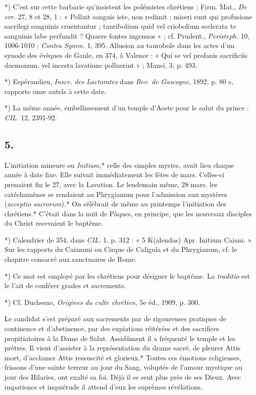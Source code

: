 \documentclass[a4paper, 11pt, oneside, polutonikogreek, french]{article}
\begin{document}
*) C'est sur cette barbarie qu'insistent les polémistes chrétiens ; Firm. Mat., \emph{De err.} 27, 8 et 28, 1 : « Polluit sanguis iste, non redimit ; miseri sunt qui profusione sacrilegi sanguinis cruentantur ; tauribolium quid vel criobolium scelerata te sanguinis labe perfundit ? Quaere fontes ingenuos » ; cf. Prudent., \emph{Peristeph.} 10, 1006-1010 ; \emph{Contra Symm.} 1, 395. Allusion au taurobole dans les actes d'un synode des évêques de Gaule, en 374, à Valence : « Qui se vel profanis sacrificiis daemonum, vel incesta lavatione polluerint » ; Mansi, 3, p. 493.

*) Espérandieu, \emph{Inscr. des Lactorates} dans \emph{Rev. de Gascogne}, 1892, p. 80 s, rapporte onze autels à cette date.

*) La même année, embellissement d'un temple d'Aoste pour le salut du prince : \emph{CIL.} 12, 2391-92.

\subsection{5.}

L'initiation mineure ou \emph{Initium},* celle des simples mystes, avait lieu chaque année à date fixe. Elle suivait immédiatement les fêtes de mars. Celles-ci prenaient fin le 27, avec la Lavation. Le lendemain même, 28 mars, les catéchumènes se rendaient au Phrygianum pour l'admission aux mystères (\emph{acceptio sacrorum}).* On célébrait de même au printemps l'initiation des chrétiens.* C'était dans la nuit de Pâques, en principe, que les nouveaux disciples du Christ recevaient le baptême.

*) Calendrier de 354, dans \emph{CIL.} 1, p. 312 : « 5 K(alendas) Apr. Initium Caiani. » Sur les rapports du Caianuni ou Cirque de Caligula et du Phrygianum, cf. le chapitre consacré aux sanctuaires de Rome.

*) Ce mot est employé par les chrétiens pour désigner le baptême. La \emph{traditio} est le l'ait de conférer grades et sacrements.

*) Cf. Duchesne, \emph{Origines du culte chrétien}, 5e éd., 1909, p. 300.

Le candidat s'est préparé aux sacrements par de rigoureuses pratiques de continence et d'abstinence, par des expiations réitérées et des sacrifices propitiatoires à la Dame de Salut. Assidûment il a fréquenté le temple et les prêtres. Il vient d'assister à la représentation du drame sacré, de pleurer Attis mort, d'acclamer Attis ressuscité et glorieux.* Toutes ces émotions religieuses, frissons d'une sainte terreur au jour du Sang, voluptés de l'amour mystique au jour des Hilaries, ont exalté sa foi. Déjà il se sent plus près de ses Dieux. Avec impatience et inquiétude il attend d'eux les suprêmes révélations.
\end{document}
